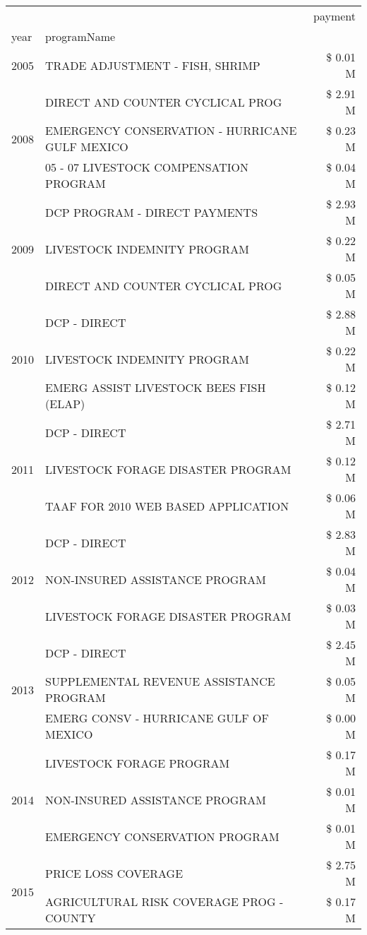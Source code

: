 \begin{tabular}{llr}
\toprule
 &  & payment \\
year & programName &  \\
\midrule
2005 & TRADE ADJUSTMENT - FISH, SHRIMP & \$ 0.01 M \\
\cline{1-3}
\multirow[t]{3}{*}{2008} & DIRECT AND COUNTER CYCLICAL PROG & \$ 2.91 M \\
 & EMERGENCY CONSERVATION - HURRICANE GULF MEXICO & \$ 0.23 M \\
 & 05 - 07 LIVESTOCK COMPENSATION PROGRAM & \$ 0.04 M \\
\cline{1-3}
\multirow[t]{3}{*}{2009} & DCP PROGRAM - DIRECT PAYMENTS & \$ 2.93 M \\
 & LIVESTOCK INDEMNITY PROGRAM & \$ 0.22 M \\
 & DIRECT AND COUNTER CYCLICAL PROG & \$ 0.05 M \\
\cline{1-3}
\multirow[t]{3}{*}{2010} & DCP - DIRECT & \$ 2.88 M \\
 & LIVESTOCK INDEMNITY PROGRAM & \$ 0.22 M \\
 & EMERG ASSIST LIVESTOCK BEES FISH (ELAP) & \$ 0.12 M \\
\cline{1-3}
\multirow[t]{3}{*}{2011} & DCP - DIRECT & \$ 2.71 M \\
 & LIVESTOCK FORAGE DISASTER PROGRAM & \$ 0.12 M \\
 & TAAF FOR 2010 WEB BASED APPLICATION & \$ 0.06 M \\
\cline{1-3}
\multirow[t]{3}{*}{2012} & DCP - DIRECT & \$ 2.83 M \\
 & NON-INSURED ASSISTANCE PROGRAM & \$ 0.04 M \\
 & LIVESTOCK FORAGE DISASTER PROGRAM & \$ 0.03 M \\
\cline{1-3}
\multirow[t]{3}{*}{2013} & DCP - DIRECT & \$ 2.45 M \\
 & SUPPLEMENTAL REVENUE ASSISTANCE PROGRAM & \$ 0.05 M \\
 & EMERG CONSV - HURRICANE GULF OF MEXICO & \$ 0.00 M \\
\cline{1-3}
\multirow[t]{3}{*}{2014} & LIVESTOCK FORAGE PROGRAM & \$ 0.17 M \\
 & NON-INSURED ASSISTANCE PROGRAM & \$ 0.01 M \\
 & EMERGENCY CONSERVATION PROGRAM & \$ 0.01 M \\
\cline{1-3}
\multirow[t]{3}{*}{2015} & PRICE LOSS COVERAGE & \$ 2.75 M \\
 & AGRICULTURAL RISK COVERAGE PROG - COUNTY & \$ 0.17 M \\

\end{tabular}
